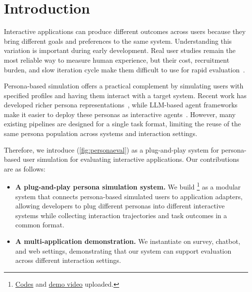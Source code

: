 \section{Introduction}

Interactive applications can produce different outcomes across users because they bring different goals and preferences to the same system.  Understanding this variation is important during early development. Real user studies remain the most reliable way to measure human experience, but their cost, recruitment burden, and slow iteration cycle make them difficult to use for rapid evaluation~\citep{xuan2025gidea,lu2025uxagent}.

Persona-based simulation offers a practical complement by simulating users with specified profiles and having them interact with a target system. Recent work has developed richer persona representations~\citep{zhang2018personachat,ge2024personahub,nvidia2025nemotron,deeppersona2025}, while LLM-based agent frameworks make it easier to deploy these personas as interactive agents~\citep{park2023generative,vezhnevets2023concordia,yang2024oasis,microsoft2024tinytroupe}. However, many existing pipelines are designed for a single task format, limiting the reuse of the same persona population across systems and interaction settings.

Therefore, we introduce \method (\autoref{fig:personaeval}) as a plug-and-play system for persona-based user simulation for evaluating interactive applications. Our contributions are as follows:
\begin{itemize}
    \item \textbf{A plug-and-play persona simulation system.} We build \method \footnote{\href{https://anonymous.4open.science/r/persona-eval-4893}{Codes} and \href{https://anonymous.4open.science/r/persona-eval-4893}{demo video} uploaded.} as a modular system that connects persona-based simulated users to application adapters, allowing developers to plug different personas into different interactive systems while collecting interaction trajectories and task outcomes in a common format.

    \item \textbf{A multi-application demonstration.} We instantiate \method on survey, chatbot, and web settings, demonstrating that our system can support evaluation across different interaction settings.
\end{itemize}